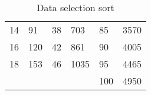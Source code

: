 \documentclass[11pt, a4paper]{article}
\begin{document}
\begin{table}[H]
\begin{tabular}{|ll|ll|ll|}
14                               & 91                             & 38                              & 703                            & 85                              & 3570                           \\
16                               & 120                            & 42                              & 861                            & 90                              & 4005                           \\
18                               & 153                            & 46                              & 1035                           & 95                              & 4465                           \\
                                 &                                &                                 &                                & 100                             & 4950                           \\ \hline
\end{tabular}
\caption{Data selection sort}
\label{selection}
\end{table}
\end{document}
